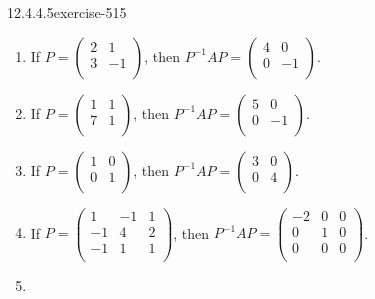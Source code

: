 \documentclass[twoside,10pt,]{book}
\numberwithin{equation}{section}
\begin{document}
\begin{divisionsolution}{12.4.4.5}{}{exercise-515}
\hypertarget{p-4640}{}%
\leavevmode%
\begin{multicols}{2}
\begin{enumerate}[label=(\alph*)]
\item\hypertarget{li-2118}{}\hypertarget{p-4641}{}%
If  \(P=\left(
\begin{array}{cc}
2 & 1 \\
3 & -1 \\
\end{array}
\right)\), then \(P^{-1}A P=\left(
\begin{array}{cc}
4 & 0 \\
0 & -1 \\
\end{array}
\right)\).%
\item\hypertarget{li-2119}{}\hypertarget{p-4642}{}%
If  \(P=\left(
\begin{array}{cc}
1 & 1 \\
7 & 1 \\
\end{array}
\right)\), then \(P^{-1}A P=\left(
\begin{array}{cc}
5 & 0 \\
0 & -1 \\
\end{array}
\right)\).%
\item\hypertarget{li-2120}{}\hypertarget{p-4643}{}%
If  \(P=\left(
\begin{array}{cc}
1 & 0 \\
0 & 1 \\
\end{array}
\right)\), then \(P^{-1}A P=\left(
\begin{array}{cc}
3 & 0 \\
0 & 4 \\
\end{array}
\right)\).%
\item\hypertarget{li-2121}{}\hypertarget{p-4644}{}%
If  \(P=\left(
\begin{array}{ccc}
1 & -1 & 1 \\
-1 & 4 & 2 \\
-1 & 1 & 1 \\
\end{array}
\right)\), then \(P^{-1}A P=\left(
\begin{array}{ccc}
-2 & 0 & 0 \\
0 & 1 & 0 \\
0 & 0 & 0 \\
\end{array}
\right)\).%
\item\hypertarget{li-2122}{}\hypertarget{p-4645}{}%

\end{enumerate}
\end{multicols}
\end{divisionsolution}
\end{document}
